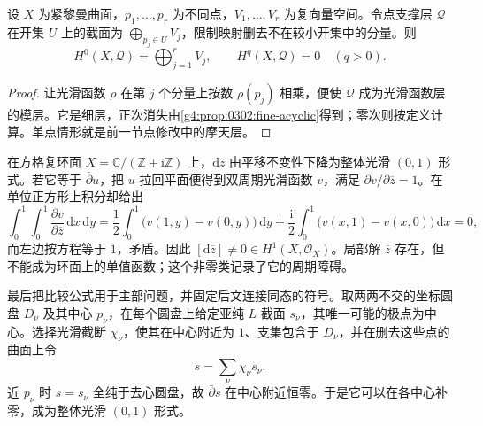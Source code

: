 \begin{corollary}
\label{g4:cor:0302:skyscraper-acyclic}
设 \(X\) 为紧黎曼曲面，\(p_1,\ldots,p_r\) 为不同点，\(V_1,\ldots,V_r\) 为复向量空间。令点支撑层 \(\mathcal Q\) 在开集 \(U\) 上的截面为 \(\bigoplus_{p_j\in U}V_j\)，限制映射删去不在较小开集中的分量。则
\[
 H^0(X,\mathcal Q)=\bigoplus_{j=1}^r V_j,\qquad
 H^q(X,\mathcal Q)=0\quad(q>0).
\]
\end{corollary}
\begin{proof}
让光滑函数 \(\rho\) 在第 \(j\) 个分量上按数 \(\rho(p_j)\) 相乘，便使 \(\mathcal Q\) 成为光滑函数层的模层。它是细层，正次消失由\cref{g4:prop:0302:fine-acyclic}得到；零次则按定义计算。单点情形就是前一节点修改中的摩天层。
\end{proof}

\begin{example}
\label{g4:exm:0302:torus-obstruction}
在方格复环面 \(X=\mathbb C/(\mathbb Z+\mathrm{i}\mathbb Z)\) 上，\(\mathrm{d}\overline z\) 由平移不变性下降为整体光滑 \((0,1)\) 形式。若它等于 \(\bar\partial u\)，把 \(u\) 拉回平面便得到双周期光滑函数 \(v\)，满足 \(\partial v/\partial\overline z=1\)。在单位正方形上积分却给出
\[
 \int_0^1\!\int_0^1\frac{\partial v}{\partial\overline z}\,\mathrm{d}x\,\mathrm{d}y
 =\frac12\int_0^1\bigl(v(1,y)-v(0,y)\bigr)\,\mathrm{d}y
  +\frac{\mathrm{i}}2\int_0^1\bigl(v(x,1)-v(x,0)\bigr)\,\mathrm{d}x=0,
\]
而左边按方程等于 \(1\)，矛盾。因此 \([\mathrm{d}\overline z]\ne0\in H^1(X,\mathcal O_X)\)。局部解 \(\overline z\) 存在，但不能成为环面上的单值函数；这个非零类记录了它的周期障碍。
\end{example}

最后把比较公式用于主部问题，并固定后文连接同态的符号。取两两不交的坐标圆盘 \(D_\nu\) 及其中心 \(p_\nu\)，在每个圆盘上给定亚纯 \(L\) 截面 \(s_\nu\)，其唯一可能的极点为中心。选择光滑截断 \(\chi_\nu\)，使其在中心附近为 \(1\)、支集包含于 \(D_\nu\)，并在删去这些点的曲面上令
\[
 s=\sum_\nu\chi_\nu s_\nu.
\]
近 \(p_\nu\) 时 \(s=s_\nu\) 全纯于去心圆盘，故 \(\bar\partial s\) 在中心附近恒零。于是它可以在各中心补零，成为整体光滑 \((0,1)\) 形式。

